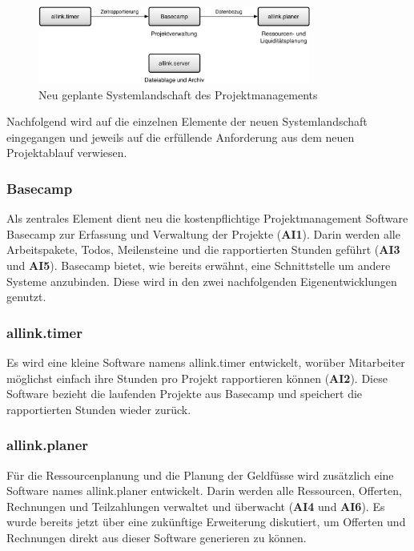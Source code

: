 \begin{figure}[htbp]
\begin{center}
\includegraphics[width=0.8\textwidth,angle=0]{./bilder/loesung/04_systemlandschaft.pdf}
\caption[Neu geplante Systemlandschaft des Projektmanagements]{Neu geplante 
    Systemlandschaft des Projektmanagements\footnotemark}
\label{pic:04_systemlandschaft}
\end{center}
\end{figure}

Nachfolgend wird auf die einzelnen Elemente der neuen Systemlandschaft
eingegangen und jeweils auf die erfüllende Anforderung aus dem neuen Projektablauf
verwiesen.

\subsubsection{Basecamp}
Als zentrales Element dient neu die kostenpflichtige Projektmanagement Software 
Basecamp zur Erfassung und Verwaltung der Projekte (\textbf{AI1}). Darin werden alle
Arbeitspakete, Todos, Meilensteine und die rapportierten Stunden geführt (\textbf{AI3} 
und \textbf{AI5}). Basecamp bietet, wie bereits erwähnt, eine Schnittstelle um
andere Systeme anzubinden. Diese wird in den zwei nachfolgenden Eigenentwicklungen
genutzt.

\subsubsection{allink.timer}
Es wird eine kleine Software namens allink.timer entwickelt, worüber Mitarbeiter 
möglichst einfach ihre Stunden pro Projekt rapportieren können (\textbf{AI2}). 
Diese Software bezieht die laufenden Projekte aus Basecamp und speichert die 
rapportierten Stunden wieder zurück.

\subsubsection{allink.planer}
Für die Ressourcenplanung und die Planung der Geldfüsse wird zusätzlich eine 
Software names allink.planer entwickelt. Darin werden alle Ressourcen, Offerten, 
Rechnungen und Teilzahlungen verwaltet und überwacht (\textbf{AI4} und \textbf{AI6}).
Es wurde bereits jetzt über eine zukünftige Erweiterung diskutiert, um 
Offerten und Rechnungen direkt aus dieser Software generieren zu können.

